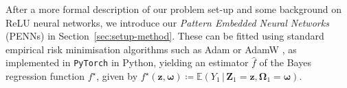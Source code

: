 \documentclass[12pt]{article}
\newcommand{\red}[1]{\textcolor{red}{#1}}
\def\hat{\widehat}
\begin{document}


After a more formal description of our problem set-up and some background on ReLU neural networks, we introduce our \emph{Pattern Embedded Neural Networks} (PENNs) in Section~\ref{sec:setup-method}.
These can be fitted using standard empirical risk minimisation algorithms such as Adam or AdamW \citep{kingma2015adam, loshchilov2018decoupled}, as implemented in \texttt{PyTorch} in Python, yielding an estimator $\hat{f}$ of the Bayes regression function $f^\star$, given by $f^\star(\bm z,\bm \omega) \coloneqq \mathbb{E}(Y_1 \, | \, \bm Z_1 = \bm z, \bm \Omega_1 = \bm \omega)$.  
\end{document}
